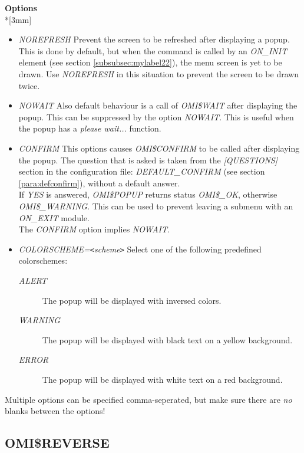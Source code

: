 \documentclass[a4paper]{book}
\newcommand{\lt}{\texttt{<}}
\newcommand{\gt}{\texttt{>}}
\begin{document}
\textbf{Options}\\*[3mm]

\begin{itemize}
\item \textsl{NOREFRESH} Prevent the screen to be refreshed after displaying a popup.
This is done by default, but when the command is called by an 
\textsl{ON{\_}INIT} element (see section \ref{subsubsec:mylabel22}), the menu 
screen is yet to be drawn. Use \textsl{NOREFRESH} in this situation to prevent the screen to be drawn twice.

\item \textsl{NOWAIT} Also default behaviour is a call of \textsl{OMI{\$}WAIT} after displaying
the popup. This can be suppressed by the option \textsl{NOWAIT}. This is useful
when the popup has a \textit{please wait...} function.

\item \textsl{CONFIRM} This options causes \textsl{OMI{\$}CONFIRM} to be called after displaying the popup. The  question that is asked is taken from the \textsl{[QUESTIONS]} section in the configuration file: \textsl{DEFAULT{\_}CONFIRM} (see section \ref{para:defconfirm}), without a default answer.\\
If \textsl{YES} is answered, \textsl{OMI{\$}POPUP} returns status \textsl{OMI{\$}{\_}OK}, otherwise \textsl{OMI{\$}{\_}WARNING}. This can be used to prevent leaving a submenu with an \textsl{ON{\_}EXIT} module.\\
The \textsl{CONFIRM} option implies \textsl{NOWAIT}.

\item \textsl{COLORSCHEME=\textit{\lt scheme\gt }} Select one of the following predefined colorschemes:\\
{\begin{description}
\item[\textsl{ALERT}] The popup will be displayed with inversed colors.
\item[\textsl{WARNING}] The popup will be displayed with black text on a yellow background.
\item[\textsl{ERROR}] The popup will be displayed with white text on a red background.
\end{description}}
\end{itemize}

Multiple options can be specified comma-seperated, but make sure there are \textit{no}
blanks between the options!

\subsection{OMI{\$}REVERSE}
\label{subsubsec:mylabel60}
\end{document}
